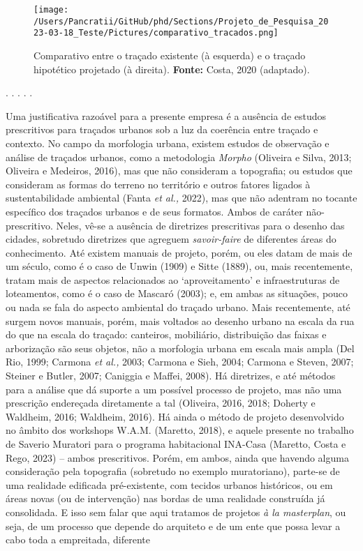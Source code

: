 \documentclass[12pt, a4paper]{book} %
\begin{document}
        \begin{figure}[h]
            \centering
            \texttt{[image: /Users/Pancratii/GitHub/phd/Sections/Projeto\_de\_Pesquisa\_2023-03-18\_Teste/Pictures/comparativo\_tracados.png]}
            \captionsetup{labelfont=bf}
            \caption{Comparativo entre o traçado existente (à esquerda) e o traçado hipotético projetado (à direita). \textbf{Fonte:} Costa, 2020 (adaptado).}
            \label{fig:comparativo_tracados}
        \end{figure} 

        \begin{center}
        . . . . .
        \end{center}

        

        Uma justificativa razoável para a presente empresa é a ausência de estudos prescritivos para traçados urbanos sob a luz da coerência entre traçado e contexto. No campo da morfologia urbana, existem estudos de observação e análise de traçados urbanos, como a metodologia \textit{Morpho} (Oliveira e Silva, 2013; Oliveira e Medeiros, 2016), mas que não consideram a topografia; ou estudos que consideram as formas do terreno no território e outros fatores ligados à sustentabilidade ambiental (Fanta \textit{et al.,} 2022), mas que não adentram no tocante específico dos traçados urbanos e de seus formatos. Ambos de caráter não-prescritivo. Neles, vê-se a ausência de diretrizes prescritivas para o desenho das cidades, sobretudo diretrizes que agreguem \textit{savoir-faire} de diferentes áreas do conhecimento. Até existem manuais de projeto, porém, ou eles datam de mais de um século, como é o caso de Unwin (1909) e Sitte (1889), ou, mais recentemente, tratam mais de aspectos relacionados ao `aproveitamento' e infraestruturas de loteamentos, como é o caso de Mascaró (2003); e, em ambas as situações, pouco ou nada se fala do aspecto ambiental do traçado urbano. Mais recentemente, até surgem novos manuais, porém, mais voltados ao desenho urbano na escala da rua do que na escala do traçado: canteiros, mobiliário, distribuição das faixas e arborização são seus objetos, não a morfologia urbana em escala mais ampla (Del Rio, 1999; Carmona \textit{et al.,} 2003; Carmona e Sieh, 2004; Carmona e Steven, 2007; Steiner e Butler, 2007; Caniggia e Maffei, 2008). Há diretrizes, e até métodos para a análise que dá suporte a um possível processo de projeto, mas não uma prescrição endereçada diretamente a tal (Oliveira, 2016, 2018; Doherty e Waldheim, 2016; Waldheim, 2016). Há ainda o método de projeto desenvolvido no âmbito dos workshops W.A.M. (Maretto, 2018), e aquele presente no trabalho de Saverio Muratori para o programa habitacional INA-Casa (Maretto, Costa e Rego, 2023) – ambos prescritivos. Porém, em ambos, ainda que havendo alguma consideração pela topografia (sobretudo no exemplo muratoriano), parte-se de uma realidade edificada pré-existente, com tecidos urbanos históricos, ou em áreas novas (ou de intervenção) nas bordas de uma realidade construída já consolidada. E isso sem falar que aqui tratamos de projetos \textit{à la masterplan}, ou seja, de um processo que depende do arquiteto e de um ente que possa levar a cabo toda a empreitada, diferente 
\end{document}
